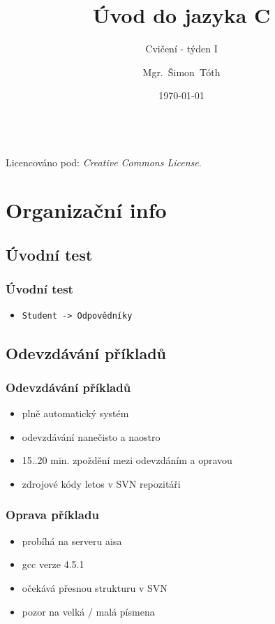 

\title{Úvod do jazyka C}
\subtitle{Cvičení - týden I}
\author[]{Mgr.~Šimon~Tóth}
\date{\today}

\newcommand{\CcNote}[1]{%
        Licencováno pod: \textit{Creative Commons #1 3.0 License}.%
}


	\begin{frame}
		\titlepage
		\vfill
		\begin{center}
			\\
			{\tiny\CcNote{\CcLongnameByNcSa}}
			\vspace*{2ex}
		\end{center}
	\end{frame}

\section{Organizační info}
\subsection{Úvodní test}

\begin{frame}
	\frametitle{Úvodní test}
	\begin{itemize}
		\item{\texttt{Student -> Odpovědníky}}
	\end{itemize}
\end{frame}

\subsection{Odevzdávání příkladů}

\begin{frame}
	\frametitle{Odevzdávání příkladů}
	\begin{itemize}
		\item{plně automatický systém}
		\item{odevzdávání nanečisto a naostro}
		\item{15..20 min. zpoždění mezi odevzdáním a opravou}
		\item{zdrojové kódy letos v SVN repozitáři}
	\end{itemize}
\end{frame}

\begin{frame}
	\frametitle{Oprava příkladu}
	\begin{itemize}
		\item{probíhá na serveru aisa}
		\item{gcc verze 4.5.1}
		\item{očekává přesnou strukturu v SVN}
		\item{pozor na velká / malá písmena}
	\end{itemize}
\end{frame}

